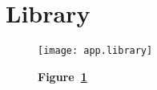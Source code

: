 \section{Library}\label{sec:library}

\begin{landscape}
	\begin{figure}[!h]
		\texttt{[image: app.library]}
		\caption*{\textbf{Figure~\ref{fig:library}}}
		\captionlistentry{}\label{fig:library}
	\end{figure}
\end{landscape}
